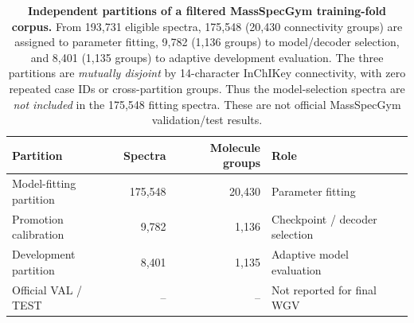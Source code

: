 \begin{table}[!htbp]
\centering
\caption{\textbf{Independent partitions of a filtered MassSpecGym training-fold corpus.} From 193,731 eligible spectra, 175,548 (20,430 connectivity groups) are assigned to parameter fitting, 9,782 (1,136 groups) to model/decoder selection, and 8,401 (1,135 groups) to adaptive development evaluation. The three partitions are \emph{mutually disjoint} by 14-character InChIKey connectivity, with zero repeated case IDs or cross-partition groups. Thus the model-selection spectra are \emph{not included} in the 175,548 fitting spectra. These are not official MassSpecGym validation/test results.}
\label{tab:msdev_split}
\small
\begin{tabular}{lrrl}
\toprule
Partition & Spectra & Molecule groups & Role \\
\midrule
Model-fitting partition & 175,548 & 20,430 & Parameter fitting \\
Promotion calibration & 9,782 & 1,136 & Checkpoint / decoder selection \\
Development partition & 8,401 & 1,135 & Adaptive model evaluation \\
Official VAL / TEST & -- & -- & Not reported for final WGV \\
\bottomrule
\end{tabular}
\end{table}

